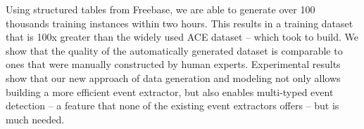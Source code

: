 Using  structured tables from Freebase, we are able to generate over 100 thousands training instances within two hours. This
results in a training dataset that is 100x greater than the widely used ACE dataset -- which took  to
build\FIXME{~\cite{}}. We show that the quality of the automatically generated dataset is comparable to ones that were manually constructed
by human experts. Experimental results show that our new approach of data generation and modeling not only allows building a more efficient
event extractor, but also enables multi-typed event detection -- a feature that none of the existing event extractors offers -- but is much
needed.








